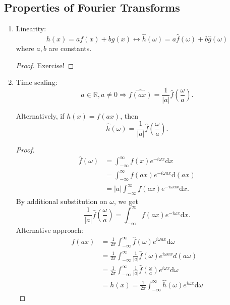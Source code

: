 \documentclass[12pt]{report}
\theoremstyle{definition}
\begin{document}
\subsection{Properties of Fourier Transforms}

\begin{enumerate}[label = (\roman*)]
    \item Linearity:\[
            h(x) = af(x) + bg(x) \longleftrightarrow \hat{h}(\omega) = a\hat{f}(\omega) + b\hat{g}(\omega)
        \]where $a,b$ are constants.
        \begin{proof}
            Exercise!
        \end{proof} 

    \item Time scaling:
        \[
            a\in\mathbb{R}, a\neq 0 \Longrightarrow{}
            \widehat{f(ax)} = \frac{1}{|a|}\hat{f}\left(\frac{\omega}{a}\right).
        \]

        Alternatively, if $h(x)=f(ax)$, then\[
            \hat{h}(\omega) = \frac{1}{|a|}\hat{f}\left(\frac{\omega}{a}\right).
        \]
        \begin{proof}
            \[
                \begin{align*}
                    \hat{f}(\omega)
                    & = \int_{-\infty}^{\infty} f(x)e^{-i\omega x}\mathrm{d}x \\
                    & = \int_{-\infty}^{\infty} f(ax)e^{-i\omega ax}\mathrm{d}(ax) \\
                    & = |a|\int_{-\infty}^{\infty} f(ax)e^{-i\omega ax}\mathrm{d}x.
                \end{align*} 
            \]By additional substitution on $\omega$, we get\[
            \frac{1}{|a|}\hat{f}\left(\frac{\omega}{a}\right) =
            \int_{-\infty}^{\infty} f(ax) e^{-i\omega x}\mathrm{d}x.
            \]
            Alternative approach:\[
                \begin{align*}
                    f(ax)
                    & = \frac{1}{2\pi} \int_{-\infty}^{\infty} \hat{f}(\omega)e^{i\omega ax}\mathrm{d}\omega \\
                    & = \frac{1}{2\pi}\int_{-\infty}^{\infty} \frac{1}{|a|}\hat{f}(\omega)e^{i\omega ax}d(a\omega) \\
                    & = \frac{1}{2\pi}\int_{-\infty}^{\infty} \frac{1}{|a|}\hat{f}\left(\frac{\omega}{a}\right)
                    e^{i\omega x}\mathrm{d}\omega \\
                    & = h(x) = \frac{1}{2\pi}\int_{-\infty}^{\infty} \hat{h}(\omega) e^{i\omega x} \mathrm{d}\omega
                \end{align*} 
            \]


\end{proof}
\end{enumerate}
\end{document}

